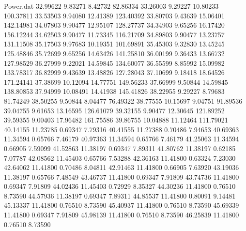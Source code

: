 \begin{filecontents}{Power.dat}
  32.99622    9.83271    8.42732   82.86334
  33.26003    9.29227   10.80233  100.37811
  33.53503    9.94080   12.41389  123.40392
  33.80703    9.43639   15.06401  142.14981
  34.07803    9.90477   12.95107  128.27737
  34.34903    9.65256   16.17420  156.12244
  34.62503    9.90477   11.73345  116.21709
  34.89803    9.90477   13.23757  131.11508
  35.17503    9.97683   10.19351  101.69891
  35.45303    9.32830   13.45245  125.48846
  35.72699    9.65256   14.63426  141.25810
  36.00199    9.36433   13.66732  127.98529
  36.27999    9.22021   14.59845  134.60077
  36.55599    8.85992   15.09982  133.78317
  36.82999    9.43639   13.48826  127.28043
  37.10699    9.18418   18.64526  171.24141
  37.38699   10.12094   14.77751  149.56233
  37.66999    9.50844   14.59845  138.80853
  37.94999   10.08491   14.41938  145.41826
  38.22955    9.29227    8.79683   81.74249
  38.50255    9.50844    8.04477   76.49322
  38.77555   10.15697    9.04751   91.89536
  39.04755    9.61653   13.16595  126.61079
  39.32155    9.90477   12.30645  121.89252
  39.59355    9.00403   17.96482  161.75586
  39.86755   10.04888   11.12464  111.79021
  40.14155   11.23785    0.69347    7.79316
  40.41555   11.27388    0.70486    7.94653
  40.69363   11.34594    0.65766    7.46179
  40.97363   11.34594    0.65766    7.46179
  41.25063   11.34594    0.66905    7.59099
  41.52863   11.38197    0.69347    7.89311
  41.80762   11.38197    0.62185    7.07787
  42.08562   11.45403    0.65766    7.53288
  42.36163   11.41800    0.63324    7.23030
  42.64062   11.41800    0.70486    8.04811
  42.91463   11.41800    0.66905    7.63920
  43.19036   11.38197    0.65766    7.48549
  43.46737   11.41800    0.69347    7.91809
  43.74736   11.41800    0.69347    7.91809
  44.02436   11.45403    0.72929    8.35327
  44.30236   11.41800    0.76510    8.73590
  44.57936   11.38197    0.69347    7.89311
  44.85537   11.41800    0.80091    9.14481
  45.13337   11.41800    0.76510    8.73590
  45.40937   11.41800    0.76510    8.73590
  45.69339   11.41800    0.69347    7.91809
  45.98139   11.41800    0.76510    8.73590
  46.25839   11.41800    0.76510    8.73590
\end{filecontents}
